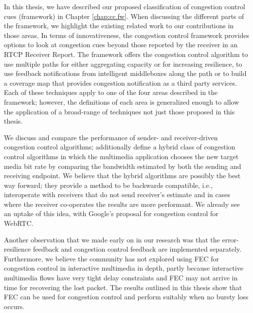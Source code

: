
In this thesis, we have described our proposed classification of congestion
control cues (framework) in Chapter \ref{chap:cc.fw}. When discussing the
different parts of the framework, we highlight the existing related work to
our contributions in those areas. In terms of innovativeness, the congestion
control framework provides options to look at congestion cues beyond those
reported by the receiver in an RTCP Receiver Report. The framework offers the
congestion control algorithm to use multiple paths for either aggregating
capacity or for increasing resilience, to use feedback notifications from
intelligent middleboxes along the path or to build a coverage map that
provides congestion notification as a third party services. Each of these
techniques apply to one of the four areas described in the framework; however,
the definitions of each area is generalized enough to allow the application of
a broad-range of techniques not just those proposed in this thesis.


We discuss and compare the performance of sender- and receiver-driven
congestion control algorithms; additionally define a hybrid class of
congestion control algorithms in which the multimedia application chooses the
new target media bit rate by comparing the bandwidth estimated by both the
sending and receiving endpoint. We believe that the hybrid algorithms are
possibly the best way forward; they provide a method to be backwards
compatible, i.e., interoperate with receivers that do not send receiver’s
estimate and in cases where the receiver co-operates the results are more
performant. We already see an uptake of this idea, with Google’s proposal for
congestion control for WebRTC.

Another observation that we made early on in our research was that the error-
resilience feedback and congestion control feedback are implemented
separately. Furthermore, we believe the community has not explored using FEC
for congestion control in interactive multimedia in depth, partly because
interactive multimedia flows have very tight delay constraints and FEC may not
arrive in time for recovering the lost packet. The results outlined in this
thesis show that FEC can be used for congestion control and perform suitably
when no bursty loss occurs.

